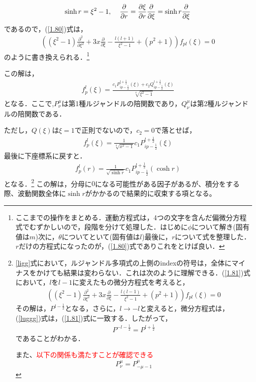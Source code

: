 \begin{align}
  \sinh r=\xi^2 -1, \hspace{4mm} \frac{\partial}{\partial r}=\frac{\partial \xi}{\partial r}\frac{\partial}{\partial \xi}=\sinh r\frac{\partial}{\partial \xi}
\end{align}
であるので，(\ref{1.80})式は，
\begin{align}
  \label{1.81}
\left(\left(\xi^2-1\right)\frac{\partial^2}{\partial \xi^2}+3 x \frac{\partial}{\partial \xi}-\frac{l (l+1)}{\xi^2-1}+(p^2+1)\right)f_{pl}(\xi)=0
\end{align}
のように書き換えられる．\footnote{ここまでの操作をまとめる．運動方程式は，4つの文字を含んだ偏微分方程式でむずかしいので，段階を分けて処理した．はじめに$\phi$について解き(固有値は$m$)次に，$\theta$についてといて(固有値は$l$)最後に，$r$について式を整理した．$r$だけの方程式になったのが，(\ref{1.80})式でありこれをとけば良い．}

この解は，\begin{align}
  f^l_p(\xi)=\frac{c_1 P_{i p-\frac{1}{2}}^{l+\frac{1}{2}}(\xi)+c_2 Q_{i p-\frac{1}{2}}^{l+\frac{1}{2}}(\xi)}{\sqrt[4]{\xi^2-1}}
\end{align}
となる．ここで,$P^{\mu}_{\nu}$は第1種ルジャンドルの陪関数であり，$Q^{\mu}_{\nu}$は第2種ルジャンドルの陪関数である．

ただし，$Q(\xi)$は$\xi=1$で正則でないので，$c_2=0$で落とせば，
\begin{align}
  f^l_p(\xi)=\frac{1}{\sqrt[4]{x^2-1}}c_1 P_{i p-\frac{1}{2}}^{l+\frac{1}{2}}(\xi)
\end{align}
最後に下座標系に戻すと．
\begin{align}
  \label{lugg}
  f^l_p(r)=\frac{1}{\sqrt{\sinh r}}c_1 P_{i p-\frac{1}{2}}^{l+\frac{1}{2}}(\cosh r)
\end{align}
となる．\footnote{\ref{ligg}式において，ルジャンドル多項式の上側のindexの符号は，全体にマイナスをかけても結果は変わらない．これは次のように理解できる．(\ref{1.81})式において，$l$を$l-1$に変えたもの微分方程式を考えると，
\begin{align}
\label{luggg}
\left(\left(\xi^2-1\right)\frac{\partial^2}{\partial \xi^2}+3 x \frac{\partial}{\partial \xi}-\frac{l (l-1)}{\xi^2-1}+(p^2+1)\right)f_{pl}(\xi)=0
\end{align}
その解は，$P^{l-\frac{1}{2}}$となる，さらに，$l\to-l$と変えると，微分方程式は，(\ref{luggg})式は，(\ref{1.81})式に一致する．したがって，
\begin{align}
  P^{-l-\frac{1}{2}}=P^{l+\frac{1}{2}}
\end{align}
であることがわかる．

また、\textcolor{red}{以下の関係も満たすことが確認できる}
\begin{equation}
  P^{\mu}_{\nu}=P^{\mu}_{-\mu-1}
\end{equation}
}
この解は，分母に$0$になる可能性がある因子があるが、積分をする際、波動関数全体に$\sinh r$がかかるので結果的に収束する項となる。


